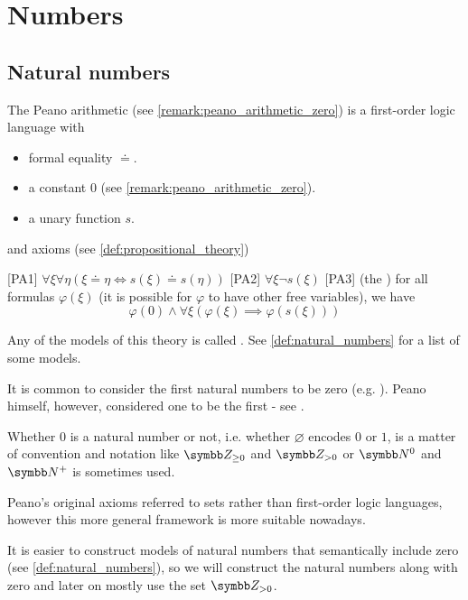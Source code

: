 \section{Numbers}\label{sec:numbers}
\subsection{Natural numbers}\label{subsec:natural_numbers}

\begin{definition}\label{def:peano_arithmetic}\cite[1]{Peano1889}
  The Peano arithmetic (see \cref{remark:peano_arithmetic_zero}) is a first-order logic language with 
  \begin{itemize}
    \item formal equality \( \doteq \).
    \item a constant \( 0 \) (see \cref{remark:peano_arithmetic_zero}).
    \item a unary function \( s \).
  \end{itemize}
  and axioms (see \cref{def:propositional_theory})
  \begin{defenum}
    [PA1] \( \forall \xi \forall \eta (\xi \doteq \eta \iff s(\xi) \doteq s(\eta)) \)
    [PA2] \( \forall \xi \neg s(\xi) \)
    [PA3] (the ) for all formulas \( \varphi(\xi) \) (it is possible for \( \varphi \) to have other free variables), we have
    \begin{equation*}
      \varphi(0) \land \forall \xi (\varphi(\xi) \implies \varphi(s(\xi)))
    \end{equation*}
  \end{defenum}

  Any of the models of this theory is called . See \cref{def:natural_numbers} for a list of some models.
\end{definition}

\begin{remark}\label{remark:peano_arithmetic_zero}
  It is common to consider the first natural numbers to be zero (e.g. \cite[67]{Enderton1977}). Peano himself, however, considered one to be the first - see \cite[1]{Peano1889}.

  Whether \( 0 \) is a natural number or not, i.e. whether \( \varnothing \) encodes \( 0 \) or \( 1 \), is a matter of convention and notation like \( \BZ_{\geq 0} \) and \( \BZ_{>0} \) or \( \BN^0 \) and \( \BN^+ \) is sometimes used.

  Peano's original axioms referred to sets rather than first-order logic languages, however this more general framework is more suitable nowadays.

  It is easier to construct models of natural numbers that semantically include zero (see \cref{def:natural_numbers}), so we will construct the natural numbers along with zero and later on mostly use the set \( \BZ_{>0} \).
\end{remark}

